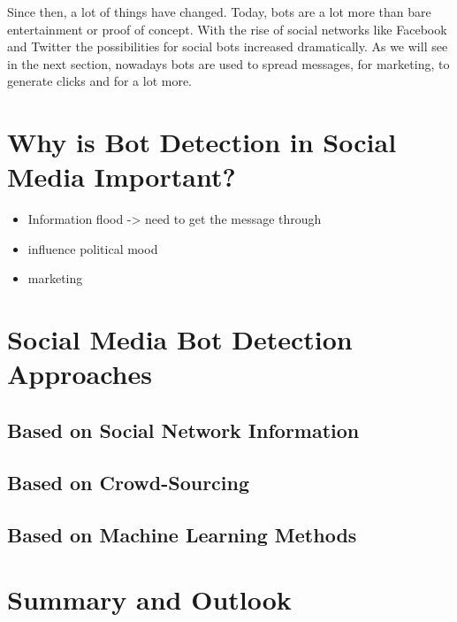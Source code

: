 Since then, a lot of things have changed. Today, bots are a lot more than bare entertainment or proof of concept. With the rise of social networks like Facebook and Twitter the possibilities for social bots increased dramatically.  As we will see in the next section, nowadays bots are used to spread messages, for marketing, to generate clicks and for a lot more.  %


\section{Why is Bot Detection in Social Media Important?}%
\begin{itemize}
	\item Information flood -> need to get the message through
	\item influence political mood
	\item marketing
\end{itemize}

\section{Social Media Bot Detection Approaches}


\subsection{Based on Social Network Information}


\subsection{Based on Crowd-Sourcing}


\subsection{Based on Machine Learning Methods}


\section{Summary and Outlook}


























\newpage